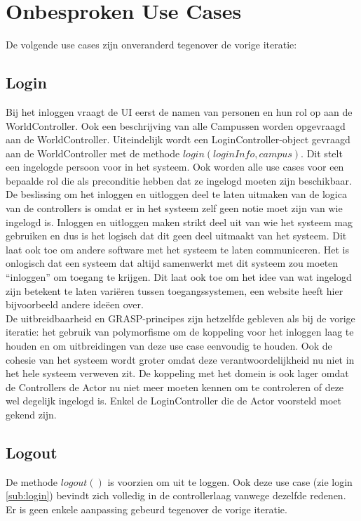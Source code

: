 \section{Onbesproken Use Cases\label{rest}}
De volgende use cases zijn onveranderd tegenover de vorige iteratie:

\subsection{Login\label{sub:login}}
Bij het inloggen vraagt de UI eerst de namen van personen en hun rol op aan de WorldController. 
Ook een beschrijving van alle Campussen worden opgevraagd aan de WorldController. 
Uiteindelijk wordt een LoginController-object gevraagd aan de WorldController met de methode $login(loginInfo, campus)$. 
Dit stelt een ingelogde persoon voor in het systeem. 
Ook worden alle use cases voor een bepaalde rol die als preconditie hebben dat ze ingelogd moeten zijn beschikbaar.\\

De beslissing om het inloggen en uitloggen deel te laten uitmaken van de logica van de controllers is omdat er in het systeem zelf geen notie moet zijn van wie ingelogd is.
Inloggen en uitloggen maken strikt deel uit van wie het systeem mag gebruiken en dus is het logisch dat dit geen deel uitmaakt van het systeem. 
Dit laat ook toe om andere software met het systeem te laten communiceren. 
Het is onlogisch dat een systeem dat altijd samenwerkt met dit systeem zou moeten ``inloggen'' om toegang te krijgen.
Dit laat ook toe om het idee van wat ingelogd zijn betekent te laten variëren tussen toegangssystemen, een website heeft hier bijvoorbeeld andere ideëen over. \\

De uitbreidbaarheid en GRASP-principes zijn hetzelfde gebleven als bij de vorige iteratie:
het gebruik van polymorfisme om de koppeling voor het inloggen laag te houden en om uitbreidingen van deze use case eenvoudig te houden. 
Ook de cohesie van het systeem wordt groter omdat deze verantwoordelijkheid nu niet in het hele systeem verweven zit. 
De koppeling met het domein is ook lager omdat de Controllers de Actor nu niet meer moeten kennen om te controleren of deze wel degelijk ingelogd is. 
Enkel de LoginController die de Actor voorsteld moet gekend zijn.

\subsection{Logout}
De methode $logout()$ is voorzien om uit te loggen. Ook deze use case (zie login \ref{sub:login}) bevindt zich volledig in de controllerlaag vanwege dezelfde redenen.
Er is geen enkele aanpassing gebeurd tegenover de vorige iteratie.

